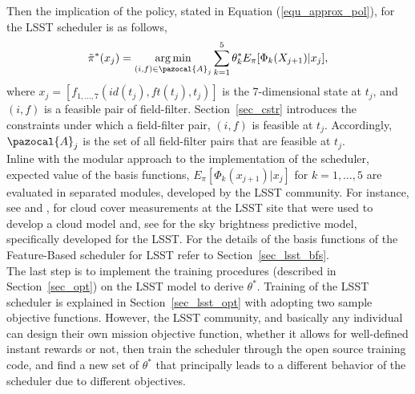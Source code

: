 \documentclass[11pt]{article}
\theoremstyle{definition}
\DeclareMathOperator*{\argmin}{arg\,min}
\begin{document}
Then the implication of the policy, stated in Equation (\ref{equ_approx_pol}), for the LSST scheduler is as follows,
\begin{equation}\label{equ_approx_pol_imp}
\tilde{\pi}^*(x_j)= \argmin_{(i,f)\in \pazocal{A}_{j}} \sum_{k=1}^5 \theta^*_k E_{\pi}[\Phi_k(X_{j+1}) | x_j]\\,
\end{equation}
where $x_j = [f_{1, \dots,7}(id(t_j),ft(t_j),t_j)]$ is the 7-dimensional state at $t_j$, and $(i,f)$ is a feasible pair of field-filter. Section~\ref{sec_cstr} introduces the constraints under which a field-filter pair, $(i,f)$ is feasible at $t_{j}$. Accordingly, $\pazocal{A}_j$ is  the set of all field-filter pairs that are feasible at $t_j$.\\
Inline with the modular approach to the implementation of the scheduler, expected value of the basis functions, $E_{\pi}[\Phi_k(x_{j+1})|x_j]$ for $k=1,\dots, 5$ are evaluated in separated modules, developed by the LSST community. For instance, see \cite{sebag2008lsst} and \cite{sebag2007lsst}, for cloud cover measurements at the LSST site that were used to develop a cloud model and, see \cite{yoachim2016optical} for the sky brightness predictive model, specifically developed for the LSST. For the details of the basis functions of the Feature-Based scheduler for LSST refer to Section~\ref{sec_lsst_bfs}.\\
The last step is to implement the training procedures (described in Section~\ref{sec_opt}) on the LSST model to derive $\theta^*$. Training of the LSST scheduler is explained in Section~\ref{sec_lsst_opt} with adopting two sample objective functions. However, the LSST community, and basically any individual can design their own mission objective function, whether it allows for well-defined instant rewards or not, then train the scheduler through the open source training code, and find a new set of $\theta^*$ that principally leads to a different behavior of the scheduler due to different objectives.\\
\end{document}
